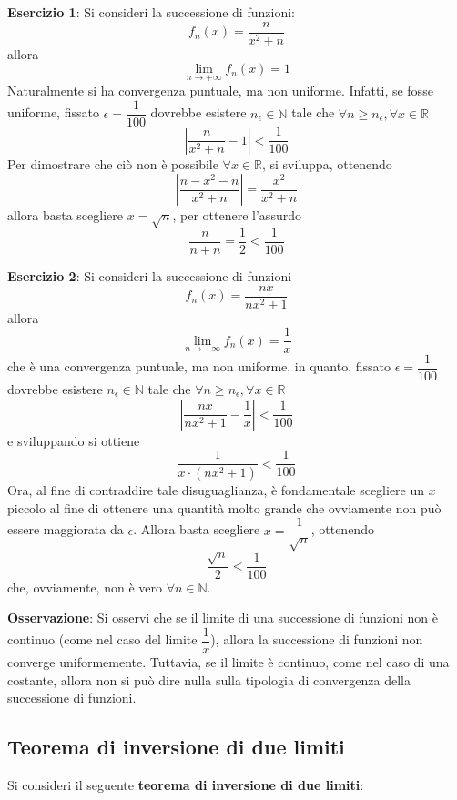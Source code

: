 \documentclass[a4paper]{extarticle}
\begin{document}
\vspace{1em}
\noindent
\textbf{Esercizio 1}: Si consideri la successione di funzioni:
\[f_n(x) = \frac{n}{x^2+n}\]
allora
\[\lim_{n \to +\infty} f_n(x) = 1\]
Naturalmente si ha convergenza puntuale, ma non uniforme. Infatti, se fosse uniforme, fissato $\epsilon=\dfrac{1}{100}$ dovrebbe esistere $n_\epsilon \in \mathbb{N}$ tale che $\forall n \geq n_\epsilon, \forall x \in \mathbb{R}$
\[\left \vert \frac{n}{x^2+n} - 1\right \vert < \frac{1}{100}\]
Per dimostrare che ciò non è possibile $\forall x \in \mathbb{R}$, si sviluppa, ottenendo
\[\left \vert \frac{n-x^2-n}{x^2+n} \right \vert = \frac{x^2}{x^2 + n}\]
allora basta scegliere $x=\sqrt{n}$, per ottenere l'assurdo
\[\frac{n}{n+n}=\frac{1}{2} < \frac{1}{100}\]

\vspace{1em}
\noindent
\textbf{Esercizio 2}: Si consideri la successione di funzioni
\[f_n(x) = \frac{nx}{nx^2+1}\]
allora
\[\lim_{n \to +\infty} f_n(x) = \frac{1}{x}\]
che è una convergenza puntuale, ma non uniforme, in quanto, fissato $\epsilon=\dfrac{1}{100}$ dovrebbe esistere $n_\epsilon \in \mathbb{N}$ tale che $\forall n \geq n_\epsilon, \forall x \in \mathbb{R}$
\[\left \vert \frac{nx}{nx^2+1} - \frac{1}{x}\right \vert < \frac{1}{100}\]
e sviluppando si ottiene
\[\frac{1}{x \cdot (nx^2+1)} < \frac{1}{100}\]
Ora, al fine di contraddire tale disuguaglianza, è fondamentale scegliere un $x$ piccolo al fine di ottenere una quantità molto grande che ovviamente non può essere maggiorata da $\epsilon$. Allora basta scegliere $x=\dfrac{1}{\sqrt{n}}$, ottenendo
\[\frac{\sqrt{n}}{2} < \frac{1}{100}\]
che, ovviamente, non è vero $\forall n \in \mathbb{N}$.

\vspace{1em}
\noindent
\textbf{Osservazione}: Si osservi che se il limite di una successione di funzioni non è continuo (come nel caso del limite $\dfrac{1}{x}$), allora la successione di funzioni non converge uniformemente. Tuttavia, se il limite è continuo, come nel caso di una costante, allora non si può dire nulla sulla tipologia di convergenza della successione di funzioni.

\vspace{1em}
\noindent
\subsection{Teorema di inversione di due limiti}
Si consideri il seguente \textbf{teorema di inversione di due limiti}:
\end{document}
